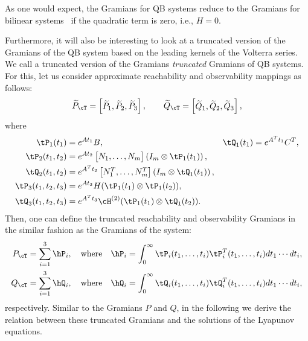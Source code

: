 \begin{remark}
As one would expect, the Gramians for QB systems reduce to the Gramians for bilinear systems~\cite{morBenD11} if the quadratic term is zero, i.e., $H = 0$.
\end{remark}

Furthermore, it will also be  interesting to look at a truncated version of the Gramians of the QB system based on the leading kernels of the Volterra series. We call a truncated version of the Gramians  \emph{truncated} Gramians of QB systems.  For this, let us consider  approximate reachability and observability mappings as follows:
\begin{equation*}
\tilde P_\cT = \bbm \tilde P_1,\tilde  P_2,\tilde P_3\ebm,\qquad \tilde Q_\cT = \bbm \tilde Q_1, \tilde Q_2,\tilde Q_3\ebm,
\end{equation*}
where
\begin{align*}
 \tP_1(t_1) &=  e^{At_1}B, & \tQ_1(t_1)&= e^{A^Tt_1}C^T,\\
\tP_2(t_1,t_2) &=  e^{At_2}\bbm N_1,\ldots,N_m\ebm \left(I_m\otimes \tP_1(t_1)\right), \\ 
 \tQ_2(t_1,t_2)&= e^{A^Tt_2}\bbm N_1^T,\ldots,N_m^T\ebm \left(I_m\otimes \tQ_1(t_1)\right),\\
\tP_3(t_1,t_2,t_3)&= e^{At_3}H (\tP_1(t_1)\otimes \tP_1(t_2)),\\
  \tQ_3(t_1,t_2,t_3)&= e^{A^Tt_3}\cH^{(2)}(\tP_1(t_1)\otimes \tQ_1(t_2)).
\end{align*}
Then, one can define the truncated reachability and observability Gramians in the similar fashion as the Gramians of the system:
\begin{subequations}\label{eq:trun_con}
	\begin{align}
P_\cT & = \sum_{i=1}^3 \hP_i,\quad\text{where}\quad \hP_i =  \int_0^\infty \tP_i(t_1,\ldots,t_i)\tP_i^T(t_1,\ldots,t_i)dt_1\cdots dt_i, \label{eq:tru_con}\\
 Q_\cT &= \sum_{i=1}^3\hQ_i,\quad \text{where}\quad \hQ_i = \int_0^\infty \tQ_i(t_1,\ldots,t_i)\tQ_i^T(t_1,\ldots,t_i)dt_1\cdots dt_i,\label{eq:tru_obs}
\end{align}
\end{subequations}
respectively. Similar to the Gramians $P$ and $Q$,  in the following we derive the relation between these truncated Gramians and the solutions of the Lyapunov equations.
